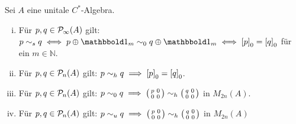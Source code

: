 \begin{proposition}[label=prop:68]
	Sei $A$ eine unitale $C^*$-Algebra.
	\begin{enumerate}[(i)]
		\item Für $p,q \in \Pinfty(A)$ gilt: $p \sim_s q \iff p \oplus \ind_m \sim_0 q \oplus \ind_m \iff \benbrace*{p}_0 = \benbrace*{q}_0$ für ein $m \in \mathbb{N}$.
		\item Für $p,q \in \kernedP_n(A)$ gilt: $p \sim_h q \implies \benbrace*{p}_0 = \benbrace*{q}_0$.
		\item Für $p,q \in \kernedP_n(A)$ gilt: $p \sim_0 q \implies \begin{psmallmatrix} p &0 \\ 0 & 0 \end{psmallmatrix} \sim_h \begin{psmallmatrix} q &0 \\ 0 & 0 \end{psmallmatrix}$ in $M_{2n}(A)$.
		\item Für $p,q \in \kernedP_n(A)$ gilt: $p \sim_u q \implies \begin{psmallmatrix} p &0 \\ 0 & 0 \end{psmallmatrix} \sim_h \begin{psmallmatrix} q &0 \\ 0 & 0 \end{psmallmatrix}$ in $M_{2n}(A)$
	\end{enumerate}
\end{proposition}
